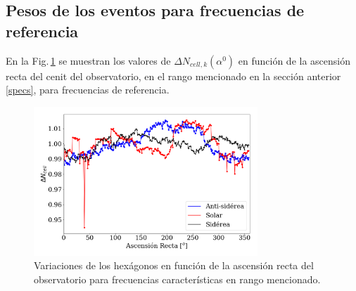\subsection{Pesos de los eventos para frecuencias de referencia}

En la Fig.\,\ref{pesos_bin_1_2} se muestran los valores de  $\Delta N_{cell,k}(\alpha^0)$ en función de la ascensión recta del cenit del observatorio, en el rango mencionado en la sección anterior \ref{specs}, para frecuencias de referencia. 
			 
			\begin{figure}[H]
				\centering
				\includegraphics[width=0.75\textwidth]{weights_2013_2020.png}
				\caption{Variaciones de los hexágonos en función de la ascensión recta del observatorio para frecuencias características en rango mencionado. }
				\label{pesos_bin_1_2}
			\end{figure}



